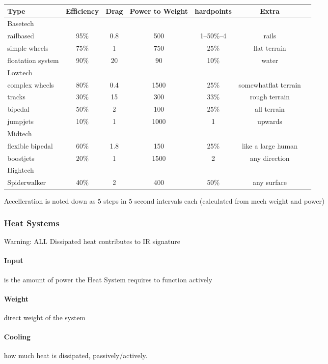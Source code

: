 \begin{tabular}{l|cccccl}
    Type    & Efficiency & Drag & Power to Weight & hardpoints &Extra\\
    \hline
    Basetech\\
    railbased            & 95\%& 0.8 & 500 & 1--50\%--4 & rails \\
    simple wheels        & 75\% & 1 & 750 & 25\% & flat terrain \\
    floatation system    & 90\% & 20 &  90 & 10\% & water\\
    \hline
    Lowtech\\
    complex wheels       & 80\% & 0.4 & 1500 & 25\% &  somewhatflat terrain \\
    tracks               & 30\% & 15 & 300 & 33\% & rough terrain\\
    bipedal              & 50\% & 2& 100 & 25\% & all terrain\\
    jumpjets             & 10\% & 1 &1000 & 1 & upwards\\
    \hline
    Midtech\\
    flexible bipedal     & 60\% & 1.8 & 150 & 25\% &  like a large human\\
    boostjets            & 20\% & 1 & 1500 & 2 &  any direction\\
    \hline Hightech\\
    Spiderwalker         & 40\% & 2 & 400 & 50\% & any surface\\
\end{tabular}\par

Accelleration is noted down as 5 steps in 5 second intervals each (calculated from mech weight and power)

\subsubsection{Heat Systems}\label{sec:heat-systems}
Warning: ALL Dissipated heat contributes to IR signature
\paragraph{Input} is the amount of power the Heat System requires to function actively
\paragraph{Weight} direct weight of the system
\paragraph{Cooling} how much heat is dissipated, passively/actively.
